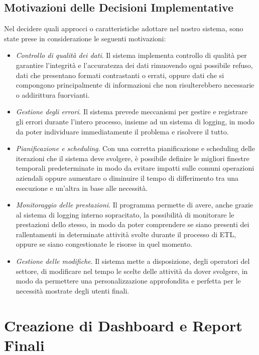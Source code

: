 \subsection{Motivazioni delle Decisioni Implementative}

Nel decidere quali approcci o caratteristiche adottare nel nostro sistema, sono state prese in considerazione le seguenti motivazioni:
\begin{itemize}
    \item \textit{Controllo di qualità dei dati}. Il sistema implementa controllo di qualità per garantire l'integrità e l'accuratezza dei dati rimuovendo ogni possibile refuso, dati che presentano formati contrastanti o errati, oppure dati che si compongono principalmente di informazioni che non risulterebbero necessarie o addirittura fuorvianti.
    \item \textit{Gestione degli errori}. Il sistema prevede meccanismi per gestire e registrare gli errori durante l'intero processo, insieme ad un sistema di logging, in modo da poter individuare immediatamente il problema e risolvere il tutto.
    \item \textit{Pianificazione e scheduling}. Con una corretta pianificazione e scheduling delle iterazioni che il sistema deve svolgere, è possibile definire le migliori finestre temporali predeterminate in modo da evitare impatti sulle comuni operazioni aziendali oppure aumentare o diminuire il tempo di differimento tra una esecuzione e un'altra in base alle necessità.
    \item \textit{Monitoraggio delle prestazioni}. Il programma permette di avere, anche grazie al sistema di logging interno sopracitato, la possibilità di monitorare le prestazioni dello stesso, in modo da poter comprendere se siano presenti dei rallentamenti in determinate attività svolte durante il processo di ETL, oppure se siano congestionate le risorse in quel momento.
    \item \textit{Gestione delle modifiche}. Il sistema mette a disposizione, degli operatori del settore, di modificare nel tempo le scelte delle attività da dover svolgere, in modo da permettere una personalizzazione approfondita e perfetta per le necessità mostrate degli utenti finali.
\end{itemize}

\section{Creazione di Dashboard e Report Finali}


